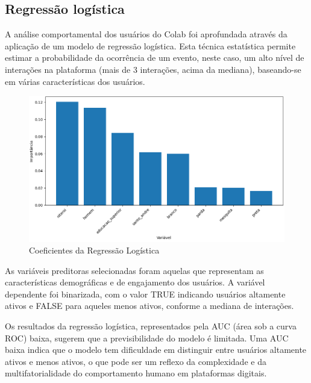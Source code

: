\subsection*{Regressão logística}

A análise comportamental dos usuários do Colab foi aprofundada através da aplicação de um modelo de regressão logística. Esta técnica estatística permite estimar a probabilidade da ocorrência de um evento, neste caso, um alto nível de interações na plataforma (mais de 3 interações, acima da mediana), baseando-se em várias características dos usuários.

\begin{figure}[!htb]
	\caption{Coeficientes da Regressão Logística}
	\label{fig:regression_chart}
	\centering
	\includegraphics[scale=0.6]{images/regression_chart.png}
\end{figure}

As variáveis preditoras selecionadas foram aquelas que representam as características demográficas e de engajamento dos usuários. A variável dependente foi binarizada, com o valor TRUE indicando usuários altamente ativos e FALSE para aqueles menos ativos, conforme a mediana de interações.

Os resultados da regressão logística, representados pela AUC (área sob a curva ROC) baixa, sugerem que a previsibilidade do modelo é limitada. Uma AUC baixa indica que o modelo tem dificuldade em distinguir entre usuários altamente ativos e menos ativos, o que pode ser um reflexo da complexidade e da multifatorialidade do comportamento humano em plataformas digitais.

